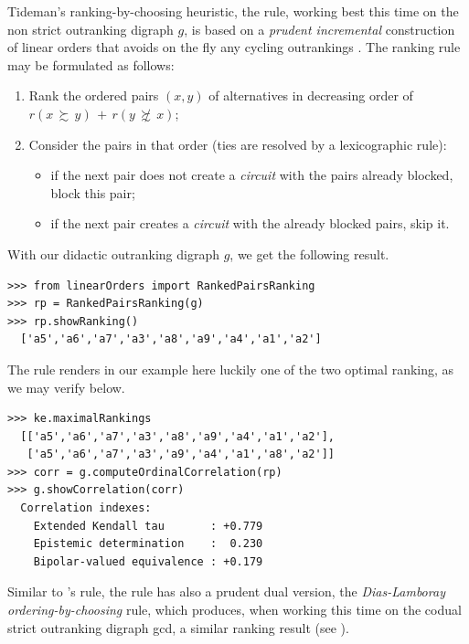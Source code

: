 Tideman's  ranking-by-choosing heuristic, the \RankedPairs rule, working best this time on the non strict outranking digraph $g$, is based on a \emph{prudent incremental} construction of linear orders that avoids on the fly any cycling outrankings \citep{TID-1987}. The ranking rule may be formulated as follows:
\begin{definition}
\begin{enumerate}[leftmargin=0.5cm,rightmargin=0.5cm]
 \item Rank the ordered pairs $(x,y)$ of alternatives in decreasing order of $r(x\, \succsim \,y) \,+\, r(y\, \not\succsim \,x)$;
 \item Consider the pairs in that order (ties are resolved by a lexicographic rule):
   \begin{itemize}
     \item if the next pair does not create a \emph{circuit} with the pairs already blocked, block this pair;
     \item if the next pair creates a \emph{circuit} with the already blocked pairs, skip it.
    \end{itemize}
\end{enumerate}
\end{definition}  
With our didactic outranking digraph $g$, we get the following result.
\begin{lstlisting}[caption={Computing a \RankedPairs ranking},label=list:8.15]   
>>> from linearOrders import RankedPairsRanking
>>> rp = RankedPairsRanking(g)
>>> rp.showRanking()
  ['a5','a6','a7','a3','a8','a9','a4','a1','a2']
\end{lstlisting}

The \RankedPairs rule renders in our example here luckily one of the two optimal \Kemeny ranking, as we may verify below.
 \begin{lstlisting}
>>> ke.maximalRankings
  [['a5','a6','a7','a3','a8','a9','a4','a1','a2'],
   ['a5','a6','a7','a3','a9','a4','a1','a8','a2']]
>>> corr = g.computeOrdinalCorrelation(rp)
>>> g.showCorrelation(corr)
  Correlation indexes:
    Extended Kendall tau       : +0.779
    Epistemic determination    :  0.230
    Bipolar-valued equivalence : +0.179
\end{lstlisting}

Similar to \Kohler 's rule, the \RankedPairs rule has also a prudent dual version, the \emph{Dias-Lamboray} \emph{ordering-by-choosing} rule, which produces, when working this time on the codual strict outranking digraph gcd, a similar ranking result (see \citet*{DIA-2010}).

